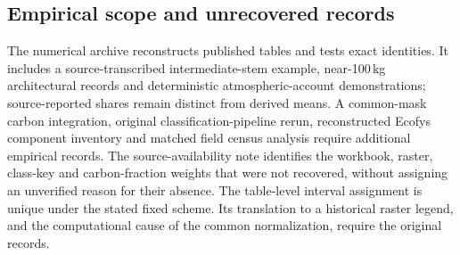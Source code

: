 \documentclass[11pt,a4paper]{article}
\theoremstyle{remark}
\begin{document}
\subsection{Empirical scope and unrecovered records}
The numerical archive reconstructs published tables and tests exact identities. It includes a source-transcribed intermediate-stem example, near-100\,kg architectural records and deterministic atmospheric-account demonstrations; source-reported shares remain distinct from derived means. A common-mask carbon integration, original classification-pipeline rerun, reconstructed Ecofys component inventory and matched field census analysis require additional empirical records. The source-availability note identifies the workbook, raster, class-key and carbon-fraction weights that were not recovered, without assigning an unverified reason for their absence. The table-level interval assignment is unique under the stated fixed scheme. Its translation to a historical raster legend, and the computational cause of the common normalization, require the original records.



\clearpage



\end{document}
